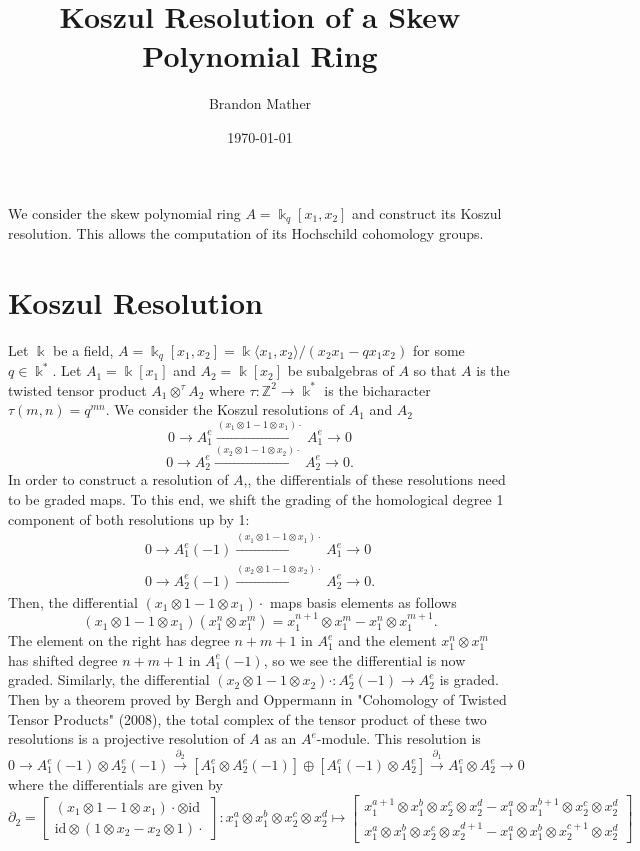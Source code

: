 \documentclass[12pt,a4paper]{article}
\title{Koszul Resolution of a Skew Polynomial Ring}
\author{Brandon Mather}
\date{\today}
\affil{Departments of Mathematics, University of North Texas}
\newcommand\ZZ{\mathbb{Z}}
\newcommand{\kk}{\Bbbk}
\newcommand\1{_{(1)}}
\newcommand\2{_{(2)}}
\begin{document}
\maketitle

We consider the skew polynomial ring $A=\kk_q[x_1,x_2]$ and construct its Koszul resolution. 
This allows the computation of its Hochschild cohomology groups.

\section{Koszul Resolution}

Let $\kk$ be a field, $A=\kk_q[x_1,x_2]=\kk\langle x_1,x_2\rangle/(x_2x_1-qx_1x_2)$ for some $q\in\kk^*$.
Let $A_1=\kk[x_1]$ and $A_2=\kk[x_2]$ be subalgebras of $A$ so that $A$ is the twisted tensor product $A_1\otimes^\tau A_2$ where $\tau:\ZZ^2\to\kk^*$ is the bicharacter $\tau(m,n)= q^{mn}$.
We consider the Koszul resolutions of $A_1$ and $A_2$
\[
  0\to A_1^e\xrightarrow{(x_1\otimes 1-1\otimes x_1)\cdot}A_1^e\to 0
\]
\[
0\to A_2^e\xrightarrow{(x_2\otimes 1-1\otimes x_2)\cdot}A_2^e\to 0.  
\]
In order to construct a resolution of $A$,, the differentials of these resolutions need to be graded maps.
To this end, we shift the grading of the homological degree 1 component of both resolutions up by 1:
\begin{align*}
0\to A_1^e(-1)\xrightarrow{(x_1\otimes 1-1\otimes x_1)\cdot}A_1^e\to 0\\
0\to A_2^e(-1)\xrightarrow{(x_2\otimes 1-1\otimes x_2)\cdot}A_2^e\to 0.  
\end{align*}
Then, the differential $(x_1\otimes 1-1\otimes x_1)\cdot$ maps basis elements as follows
\[
(x_1\otimes 1-1\otimes x_1)(x_1^n\otimes x_1^m)=x_1^{n+1}\otimes x_1^m-x_1^n\otimes x_1^{m+1}.
\]
The element on the right has degree $n+m+1$ in $A_1^e$ and the element $x_1^n\otimes x_1^m$ has shifted degree $n+m+1$ in $A_1^e(-1)$, so we see the differential is now graded.
Similarly, the differential $(x_2\otimes 1-1\otimes x_2)\cdot:A_2^e(-1)\to A_2^e$ is graded.
\\

Then by a theorem proved by Bergh and Oppermann in "Cohomology of Twisted Tensor Products" (2008), the total complex of the tensor product of these two resolutions is a projective resolution of $A$ as an $A^e$-module.
This resolution is 
\[
0\to A_1^e(-1)\otimes A_2^e(-1)\xrightarrow{\partial_2}\left[A_1^e\otimes A_2^e(-1)\right]\oplus \left[A_1^e(-1)\otimes A_2^e\right]\xrightarrow{\partial_1}A_1^e\otimes A_2^e\to 0
\]
where the differentials are given by
\[
\partial_2=\begin{bmatrix}(x_1\otimes 1-1\otimes x_1)\cdot\otimes \text{id}\\\text{id}\otimes(1\otimes x_2-x_2\otimes 1)\cdot\end{bmatrix}:x_1^a\otimes x_1^b\otimes x_2^c\otimes x_2^d\mapsto\begin{bmatrix}x_1^{a+1}\otimes x_1^b\otimes x_2^c\otimes x_2^d-x_1^a\otimes x_1^{b+1}\otimes x_2^c\otimes x_2^d\\ x_1^a\otimes x_1^b\otimes x_2^c\otimes x_2^{d+1}-x_1^a\otimes x_1^b\otimes x_2^{c+1}\otimes x_2^d\end{bmatrix}
\]
\end{document}
